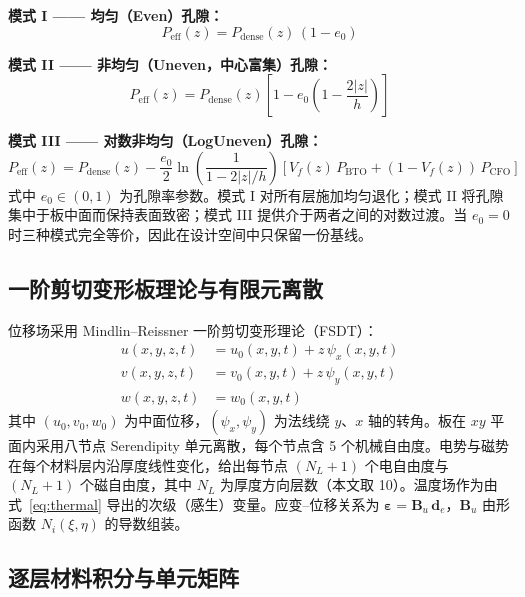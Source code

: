 \documentclass[11pt,a4paper]{ctexart}
\newcommand{\beps}{\bm{\varepsilon}}
\begin{document}
\noindent\textbf{模式 I —— 均匀（Even）孔隙：}
\begin{equation}
P_{\text{eff}}(z) = P_{\text{dense}}(z)\,(1 - e_0)
\label{eq:poro-even}
\end{equation}

\noindent\textbf{模式 II —— 非均匀（Uneven，中心富集）孔隙：}
\begin{equation}
P_{\text{eff}}(z) = P_{\text{dense}}(z)\left[1 - e_0\left(1 - \frac{2|z|}{h}\right)\right]
\label{eq:poro-uneven}
\end{equation}

\noindent\textbf{模式 III —— 对数非均匀（LogUneven）孔隙：}
\begin{equation}
P_{\text{eff}}(z) = P_{\text{dense}}(z) - \frac{e_0}{2}\ln\!\left(\frac{1}{1 - 2|z|/h}\right)\left[V_f(z)\,P_{\text{BTO}} + (1-V_f(z))\,P_{\text{CFO}}\right]
\label{eq:poro-log}
\end{equation}
式中 $e_0 \in (0, 1)$ 为孔隙率参数。模式 I 对所有层施加均匀退化；模式 II 将孔隙集中于板中面而保持表面致密；模式 III 提供介于两者之间的对数过渡。当 $e_0 = 0$ 时三种模式完全等价，因此在设计空间中只保留一份基线。

\subsection{一阶剪切变形板理论与有限元离散}

位移场采用 Mindlin--Reissner 一阶剪切变形理论（FSDT）：
\begin{equation}
\begin{aligned}
u(x,y,z,t) &= u_0(x,y,t) + z\,\psi_x(x,y,t) \\
v(x,y,z,t) &= v_0(x,y,t) + z\,\psi_y(x,y,t) \\
w(x,y,z,t) &= w_0(x,y,t)
\end{aligned}
\label{eq:fsdt}
\end{equation}
其中 $(u_0, v_0, w_0)$ 为中面位移，$(\psi_x, \psi_y)$ 为法线绕 $y$、$x$ 轴的转角。板在 $xy$ 平面内采用八节点 Serendipity 单元离散，每个节点含 5 个机械自由度。电势与磁势在每个材料层内沿厚度线性变化，给出每节点 $(N_L+1)$ 个电自由度与 $(N_L+1)$ 个磁自由度，其中 $N_L$ 为厚度方向层数（本文取 10）。温度场作为由式~\eqref{eq:thermal} 导出的次级（感生）变量。应变--位移关系为 $\beps = \bm{B}_u\,\bm{d}_e$，$\bm{B}_u$ 由形函数 $N_i(\xi,\eta)$ 的导数组装。

\subsection{逐层材料积分与单元矩阵}
\end{document}
